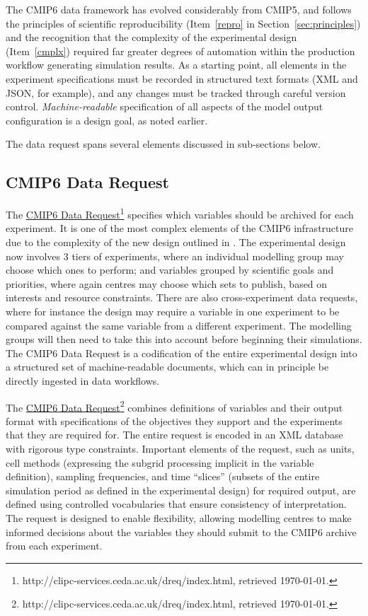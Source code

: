\documentclass[gmd,manuscript]{copernicus}
\begin{document}
The CMIP6 data framework has evolved considerably from CMIP5, and
follows the principles of scientific reproducibility (Item~\ref{repro}
in Section~\ref{sec:principles}) and the recognition that the
complexity of the experimental design (Item~\ref{cmplx}) required far
greater degrees of automation within the production workflow
generating simulation results. As a starting point, all elements in
the experiment specifications must be recorded in structured text
formats (XML and JSON, for example), and any changes must be tracked
through careful version control. \emph{Machine-readable} specification
of all aspects of the model output configuration is a design goal, as
noted earlier.

The data request spans several elements discussed in sub-sections
below.

\subsection{CMIP6 Data Request}
\label{sec:data-request}

The \href{http://clipc-services.ceda.ac.uk/dreq/index.html}{CMIP6 Data
  Request}\footnote{http://clipc-services.ceda.ac.uk/dreq/index.html,
  retrieved \today.} specifies which variables should be archived for
each experiment. It is one of the most complex elements of the CMIP6
infrastructure due to the complexity of the new design outlined in
\cite{ref:eyringetal2016a}. The experimental design now involves 3
tiers of experiments, where an individual modelling group may choose
which ones to perform; and variables grouped by scientific goals and
priorities, where again centres may choose which sets to publish,
based on interests and resource constraints. There are also
cross-experiment data requests, where for instance the design may
require a variable in one experiment to be compared against the same
variable from a different experiment. The modelling groups will then
need to take this into account before beginning their simulations. The
CMIP6 Data Request is a codification of the entire experimental design
into a structured set of machine-readable documents, which can in
principle be directly ingested in data workflows.

The \href{http://clipc-services.ceda.ac.uk/dreq/index.html}{CMIP6 Data
  Request}\footnote{http://clipc-services.ceda.ac.uk/dreq/index.html,
  retrieved \today.} \citep{ref:juckesetal2015} combines definitions
of variables and their output format with specifications of the
objectives they support and the experiments that they are required
for. The entire request is encoded in an XML database with rigorous
type constraints. Important elements of the request, such as units,
cell methods (expressing the subgrid processing implicit in the
variable definition), sampling frequencies, and time ``slices''
(subsets of the entire simulation period as defined in the
experimental design) for required output, are defined using controlled
vocabularies that ensure consistency of interpretation. The request is
designed to enable flexibility, allowing modelling centres to make
informed decisions about the variables they should submit to the CMIP6
archive from each experiment.
\end{document}
